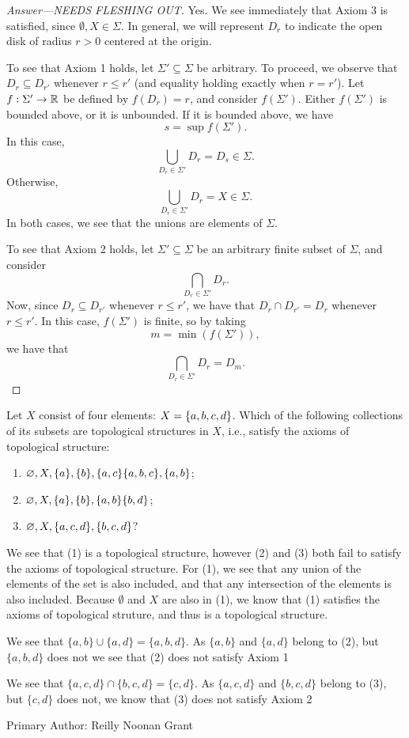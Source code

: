 \begin{proof}[Answer---NEEDS FLESHING OUT]
    Yes. We see immediately that Axiom 3 is satisfied, since $\emptyset, X \in
    \Sigma$. In general, we will represent $D_r$ to indicate the open disk of
    radius $r > 0$ centered at the origin.

    To see that Axiom 1 holds, let $\Sigma' \subseteq \Sigma$ be arbitrary. To
    proceed, we observe that $D_r \subseteq D_{r'}$ whenever $r \leq r'$ (and
    equality holding exactly when $r = r'$). Let $f : \Sigma' \to \mathbb{R}$ be
    defined by $f(D_r) = r$, and consider $f(\Sigma')$. Either $f(\Sigma')$ is
    bounded above, or it is unbounded. If it is bounded above, we have
    \[
        s = \sup f(\Sigma').
    \]
    In this case,
    \[
        \bigcup_{D_r \in \Sigma'} D_r = D_s \in \Sigma.
    \]
    Otherwise,
    \[
        \bigcup_{D_r \in \Sigma'} D_r = X \in \Sigma.
    \]
    In both cases, we see that the unions are elements of $\Sigma$.

    To see that Axiom 2 holds, let $\Sigma' \subseteq \Sigma$ be an arbitrary
    finite subset of $\Sigma$, and consider
    \[
        \bigcap_{D_r \in \Sigma'} D_r.
    \]
    Now, since $D_r \subseteq D_{r'}$ whenever $r \leq r'$, we have that $D_r
    \cap D_{r'} = D_r$ whenever $ r \leq r'$. In this case, $f(\Sigma')$ is
    finite, so by taking
    \[
        m = \min(f(\Sigma')),
    \]
    we have that
    \[
        \bigcap_{D_r \in \Sigma'} D_r = D_m.
    \]
\end{proof}

\begin{minorEx} %
    Let $X$ consist of four elements: $X = \{a, b, c, d\}$. Which of the
    following collections of its subsets are topological structures in $X$,
    i.e., satisfy the axioms of topological structure:
    \begin{enumerate}
        \item $\varnothing, X, \{a\}, \{b\}, \{a,c\} \{a,b,c\},
            \{a,b\}$;
        \item $\varnothing, X, \{a\}, \{b\}, \{a,b\} \{b,d\}$;
        \item $\varnothing, X, \{a,c,d\}, \{b,c,d\}$?
    \end{enumerate}
\end{minorEx}

We see that (1) is a topological structure, however (2) and (3) both
fail to satisfy the axioms of topological structure. For (1), we see
that any union of the elements of the set is also included, and that
any intersection of the elements is also included. Because $\emptyset$
and $X$ are also in (1), we know that (1) satisfies the axioms of
topological struture, and thus is a topological structure. 

We see that $\{a,b\} \cup \{a,d\} = \{a,b,d\}$. As $\{a,b\}$ and
$\{a,d\} $ belong to (2), but $\{a,b,d\}$ does not we see that (2) does not
satisfy Axiom 1

We see that $\{a,c,d\} \cap \{b,c,d\} =\{c,d\}$. As $\{a,c,d\}$
and $\{b,c,d\}$ belong to (3), but $\{c,d\}$ does not, we know that 
(3) does not satisfy Axiom 2


Primary Author: Reilly Noonan Grant


